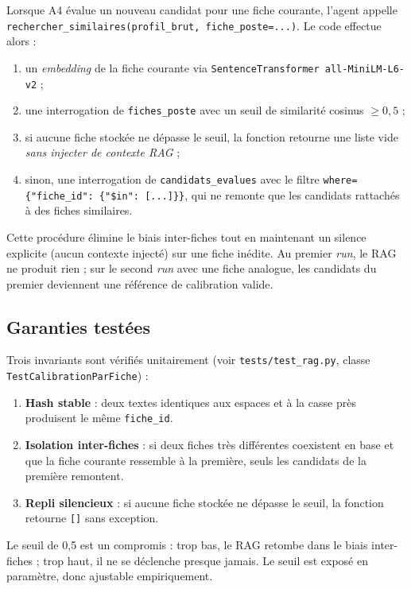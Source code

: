 Lorsque A4 évalue un nouveau candidat pour une fiche courante, l'agent appelle \texttt{rechercher\_similaires(profil\_brut, fiche\_poste=...)}. Le code effectue alors :
\begin{enumerate}
\item un \textit{embedding} de la fiche courante via \texttt{SentenceTransformer all-MiniLM-L6-v2} ;
\item une interrogation de \texttt{fiches\_poste} avec un seuil de similarité cosinus $\geq 0{,}5$ ;
\item si aucune fiche stockée ne dépasse le seuil, la fonction retourne une liste vide \textit{sans injecter de contexte RAG} ;
\item sinon, une interrogation de \texttt{candidats\_evalues} avec le filtre \texttt{where=\{"fiche\_id": \{"\$in": [...]\}\}}, qui ne remonte que les candidats rattachés à des fiches similaires.
\end{enumerate}

Cette procédure élimine le biais inter-fiches tout en maintenant un silence explicite (aucun contexte injecté) sur une fiche inédite. Au premier \textit{run}, le RAG ne produit rien ; sur le second \textit{run} avec une fiche analogue, les candidats du premier deviennent une référence de calibration valide.

\subsection{Garanties testées}

Trois invariants sont vérifiés unitairement (voir \texttt{tests/test\_rag.py}, classe \texttt{TestCalibrationParFiche}) :
\begin{enumerate}
\item \textbf{Hash stable} : deux textes identiques aux espaces et à la casse près produisent le même \texttt{fiche\_id}.
\item \textbf{Isolation inter-fiches} : si deux fiches très différentes coexistent en base et que la fiche courante ressemble à la première, seuls les candidats de la première remontent.
\item \textbf{Repli silencieux} : si aucune fiche stockée ne dépasse le seuil, la fonction retourne \texttt{[]} sans exception.
\end{enumerate}

Le seuil de 0,5 est un compromis : trop bas, le RAG retombe dans le biais inter-fiches ; trop haut, il ne se déclenche presque jamais. Le seuil est exposé en paramètre, donc ajustable empiriquement.

